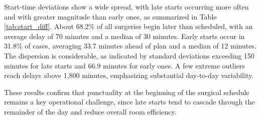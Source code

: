 \documentclass[
]{article}
\begin{document}
Start-time deviations show a wide spread, with late starts occurring
more often and with greater magnitude than early ones, as summarized in
Table \ref{tab:start_diff}. About 68.2\% of all surgeries begin later
than scheduled, with an average delay of 70 minutes and a median of 30
minutes. Early starts occur in 31.8\% of cases, averaging 33.7 minutes
ahead of plan and a median of 12 minutes. The dispersion is
considerable, as indicated by standard deviations exceeding 150 minutes
for late starts and 66.9 minutes for early ones. A few extreme outliers
reach delays above 1,800 minutes, emphasizing substantial day-to-day
variability.

These results confirm that punctuality at the beginning of the surgical
schedule remains a key operational challenge, since late starts tend to
cascade through the remainder of the day and reduce overall room
efficiency.
\end{document}
